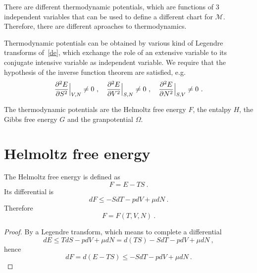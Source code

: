     There are different thermodynamic potentials, which are functions of $3$ independent variables that can be used to define a different chart for $\mathcal M$. Therefore, there are different aproaches to thermodynamics.

    Thermodynamic potentials can be obtained by various kind of Legendre transforms of~\eqref{de}, which exchange the role of an extensive variable to its conjugate intensive variable as independent variable. We require that the hypothesis of the inverse function theorem are satisfied, e.g. 
    \begin{equation*}
        \frac{\partial^2 E}{\partial S^2} \Big \vert_{V,N} \neq 0 ~, \quad \frac{\partial^2 E}{\partial V^2} \Big \vert_{S,N} \neq 0 ~, \quad \frac{\partial^2 E}{\partial N^2} \Big \vert_{S, V} \neq 0 ~.
    \end{equation*}

    The thermodynamic potentials are the Helmoltz free energy $F$, the entalpy $H$, the Gibbs free energy $G$ and the granpotential $\Omega$.

\section{Helmoltz free energy} 

    The Helmoltz free energy is defined as 
    \begin{equation*}
        F = E - TS ~.
    \end{equation*}
    Its differential is 
    \begin{equation*}
        dF \leq - S dT - p dV + \mu dN ~.
    \end{equation*}
    Therefore
    \begin{equation*}
        F = F(T, V, N) ~.
    \end{equation*}
    \begin{proof}
        By a Legendre transform, which means to complete a differential
        \begin{equation*}
            dE \leq T dS - p dV + \mu dN = d(TS) - S dT - p dV + \mu dN ~,
        \end{equation*}
        hence 
        \begin{equation*}
            dF = d(E - TS) \leq - S dT - p dV + \mu dN ~.
        \end{equation*}
    \end{proof}

